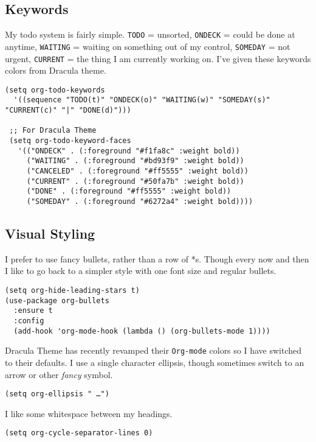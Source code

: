 \documentclass{article}
\begin{document}
\subsection{Keywords}
\label{sec-9-1}

My todo system is fairly simple. \texttt{TODO} = unsorted, \texttt{ONDECK} = could be done at anytime, \texttt{WAITING} = waiting on something out of my control, \texttt{SOMEDAY} = not urgent, \texttt{CURRENT} = the thing I am currently working on. I've given these keywords colors from Dracula theme.

\begin{verbatim}
(setq org-todo-keywords
  '((sequence "TODO(t)" "ONDECK(o)" "WAITING(w)" "SOMEDAY(s)" "CURRENT(c)" "|" "DONE(d)")))

 ;; For Dracula Theme
 (setq org-todo-keyword-faces
   '(("ONDECK" . (:foreground "#f1fa8c" :weight bold))   
     ("WAITING" . (:foreground "#bd93f9" :weight bold)) 
     ("CANCELED" . (:foreground "#ff5555" :weight bold))
     ("CURRENT" . (:foreground "#50fa7b" :weight bold))
     ("DONE" . (:foreground "#ff5555" :weight bold))
     ("SOMEDAY" . (:foreground "#6272a4" :weight bold))))
\end{verbatim}

\subsection{Visual Styling}
\label{sec-9-2}

I prefer to use fancy bullets, rather than a row of *s. Though every now and then I like to go back to a simpler style with one font size and regular bullets.

\begin{verbatim}
(setq org-hide-leading-stars t)
(use-package org-bullets
  :ensure t
  :config
  (add-hook 'org-mode-hook (lambda () (org-bullets-mode 1))))
\end{verbatim}

Dracula Theme has recently revamped their \texttt{Org-mode} colors so I have switched to their defaults. I use a single character ellipsis, though sometimes switch to an arrow or other \emph{fancy} symbol.

\begin{verbatim}
(setq org-ellipsis " …")
\end{verbatim}

I like some whitespace between my headings.

\begin{verbatim}
(setq org-cycle-separator-lines 0)
\end{verbatim}
\end{document}
